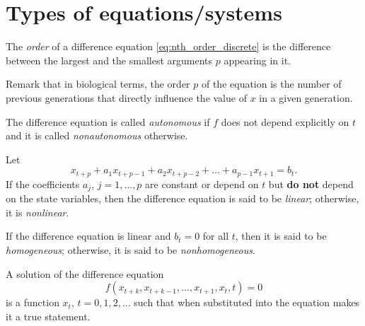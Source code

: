 \section{Types of equations/systems}
\begin{definition}
The \emph{order} of a difference equation \eqref{eq:nth_order_discrete} is the difference between the largest and the smallest arguments $p$ appearing in it.
\end{definition}
Remark that in biological terms, the order $p$ of the equation is the number of previous generations that directly influence the value of $x$ in a given generation.



\begin{definition}
The difference equation is called \emph{autonomous} if $f$ does not depend explicitly on $t$ and it is called \emph{nonautonomous} otherwise.
\end{definition}



\begin{definition}
Let 
\[
x_{t+p}+a_1 x_{t+p-1}+a_2 x_{t+p-2}+\dots +a_{p-1} x_{t+1}=b_t.
\]
If the coefficients $a_j$, $j=1,\dots,p$ are constant or depend on $t$ but \textbf{do not} depend on the state variables, then the difference equation is said to be \emph{linear}; otherwise, it is \emph{nonlinear}. 
\end{definition}

\begin{definition}
If the difference equation is linear and $b_t=0$ for all $t$, then it is said to be \emph{homogeneous}; otherwise, it is said to be \emph{nonhomogeneous}.
\end{definition}



\begin{definition}
A solution of the difference equation
$$f(x_{t+k},x_{t+k-1},\dots,x_{t+1},x_t,t)=0$$
is a function $x_t$, $t=0,1,2,\dots$ such that when substituted into the equation makes it a true statement.
\end{definition}





